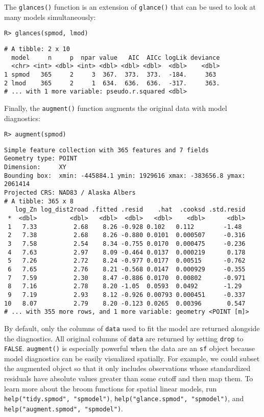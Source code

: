 \documentclass[10pt,letterpaper]{article}
\begin{document}
The \texttt{glances()} function is an extension of \texttt{glance()}
that can be used to look at many models simultaneously:

\begin{verbatim}
R> glances(spmod, lmod)
\end{verbatim}

\begin{verbatim}
# A tibble: 2 x 10
  model     n     p  npar value   AIC  AICc logLik deviance
  <chr> <int> <dbl> <int> <dbl> <dbl> <dbl>  <dbl>    <dbl>
1 spmod   365     2     3  367.  373.  373.  -184.     363 
2 lmod    365     2     1  634.  636.  636.  -317.     363.
# ... with 1 more variable: pseudo.r.squared <dbl>
\end{verbatim}

Finally, the \texttt{augment()} function augments the original data with
model diagnostics:

\begin{verbatim}
R> augment(spmod)
\end{verbatim}

\begin{verbatim}
Simple feature collection with 365 features and 7 fields
Geometry type: POINT
Dimension:     XY
Bounding box:  xmin: -445884.1 ymin: 1929616 xmax: -383656.8 ymax: 2061414
Projected CRS: NAD83 / Alaska Albers
# A tibble: 365 x 8
   log_Zn log_dist2road .fitted .resid    .hat  .cooksd .std.resid
 *  <dbl>         <dbl>   <dbl>  <dbl>   <dbl>    <dbl>      <dbl>
 1   7.33          2.68    8.26 -0.928 0.102   0.112        -1.48 
 2   7.38          2.68    8.26 -0.880 0.0101  0.000507     -0.316
 3   7.58          2.54    8.34 -0.755 0.0170  0.000475     -0.236
 4   7.63          2.97    8.09 -0.464 0.0137  0.000219      0.178
 5   7.26          2.72    8.24 -0.977 0.0177  0.00515      -0.762
 6   7.65          2.76    8.21 -0.568 0.0147  0.000929     -0.355
 7   7.59          2.30    8.47 -0.886 0.0170  0.00802      -0.971
 8   7.16          2.78    8.20 -1.05  0.0593  0.0492       -1.29 
 9   7.19          2.93    8.12 -0.926 0.00793 0.000451     -0.337
10   8.07          2.79    8.20 -0.123 0.0265  0.00396       0.547
# ... with 355 more rows, and 1 more variable: geometry <POINT [m]>
\end{verbatim}

By default, only the columns of \texttt{data} used to fit the model are
returned alongside the diagnostics. All original columns of
\texttt{data} are returned by setting \texttt{drop} to \texttt{FALSE}.
\texttt{augment()} is especially powerful when the data are an
\texttt{sf} object because model diagnostics can be easily visualized
spatially. For example, we could subset the augmented object so that it
only includes observations whose standardized residuals have absolute
values greater than some cutoff and then map them. To learn more about
the broom functions for spatial linear models, run
\texttt{help("tidy.spmod",\ "spmodel")},
\texttt{help("glance.spmod",\ "spmodel")}, and
\texttt{help("augment.spmod",\ "spmodel")}.
\end{document}

